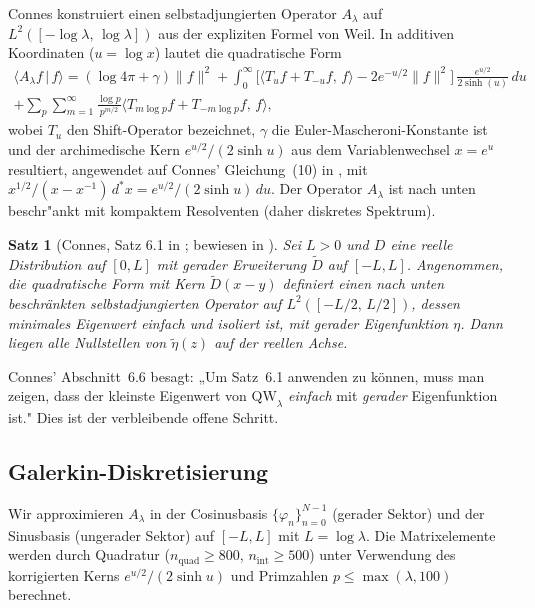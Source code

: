 ﻿\documentclass[12pt,a4paper]{article}
\newtheorem{theorem}{Satz}[section]
\theoremstyle{definition}
\theoremstyle{remark}
\begin{document}
Connes konstruiert einen selbstadjungierten Operator $A_\lambda$ auf $L^2([-\log\lambda,\,\log\lambda])$ aus der expliziten Formel von Weil. In additiven Koordinaten ($u = \log x$) lautet die quadratische Form
\begin{multline*}
  \langle A_\lambda f \,|\, f \rangle = (\log 4\pi + \gamma)\|f\|^2
  + \int_0^\infty \Big[\langle T_u f + T_{-u} f,\, f \rangle - 2e^{-u/2}\|f\|^2\Big]\,\frac{e^{u/2}}{2\sinh(u)}\,du \\
  + \sum_p \sum_{m=1}^\infty \frac{\log p}{p^{m/2}} \langle T_{m\log p} f + T_{-m\log p} f,\, f \rangle,
\end{multline*}
wobei $T_u$ den Shift-Operator bezeichnet, $\gamma$ die Euler-Mascheroni-Konstante ist und der archimedische Kern $e^{u/2}/(2\sinh u)$ aus dem Variablenwechsel $x = e^u$ resultiert, angewendet auf Connes' Gleichung~(10) in \cite{Connes2026}, mit $x^{1/2}/(x-x^{-1})\,d^*\!x = e^{u/2}/(2\sinh u)\,du$. Der Operator $A_\lambda$ ist nach unten beschr"ankt mit kompaktem Resolventen (daher diskretes Spektrum).

\begin{theorem}[Connes, Satz 6.1 in \cite{Connes2026}; bewiesen in \cite{ConnesvS2025}]
Sei $L > 0$ und $D$ eine reelle Distribution auf $[0,L]$ mit gerader Erweiterung $\tilde{D}$ auf $[-L,L]$. Angenommen, die quadratische Form mit Kern $\tilde{D}(x-y)$ definiert einen nach unten beschränkten selbstadjungierten Operator auf $L^2([-L/2,\,L/2])$, dessen minimales Eigenwert einfach und isoliert ist, mit gerader Eigenfunktion $\eta$. Dann liegen alle Nullstellen von $\tilde{\eta}(z)$ auf der reellen Achse.
\end{theorem}

\noindent Connes' Abschnitt~6.6 besagt: „Um Satz~6.1 anwenden zu können, muss man zeigen, dass der kleinste Eigenwert von $\mathrm{QW}_\lambda$ \emph{einfach} mit \emph{gerader} Eigenfunktion ist." Dies ist der verbleibende offene Schritt.

\subsection{Galerkin-Diskretisierung}

Wir approximieren $A_\lambda$ in der Cosinusbasis $\{\varphi_n\}_{n=0}^{N-1}$ (gerader Sektor) und der Sinusbasis (ungerader Sektor) auf $[-L,L]$ mit $L = \log\lambda$. Die Matrixelemente werden durch Quadratur ($n_{\mathrm{quad}} \geq 800$, $n_{\mathrm{int}} \geq 500$) unter Verwendung des korrigierten Kerns $e^{u/2}/(2\sinh u)$ und Primzahlen $p \leq \max(\lambda, 100)$ berechnet.
\end{document}
